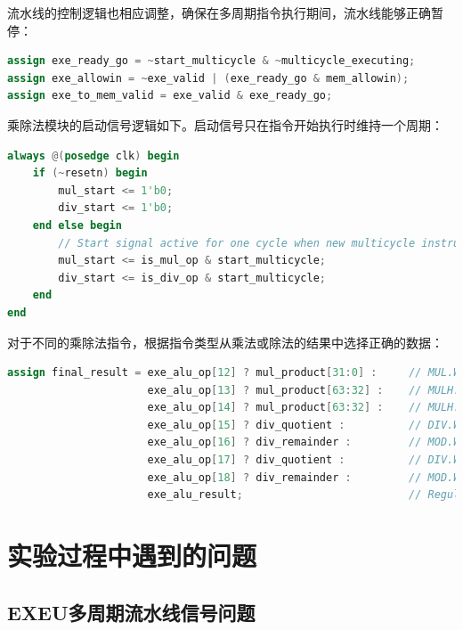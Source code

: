 \documentclass[11pt]{article}
\begin{document}
流水线的控制逻辑也相应调整，确保在多周期指令执行期间，流水线能够正确暂停：

\begin{lstlisting}[language=verilog]
assign exe_ready_go = ~start_multicycle & ~multicycle_executing;
assign exe_allowin = ~exe_valid | (exe_ready_go & mem_allowin);
assign exe_to_mem_valid = exe_valid & exe_ready_go;
\end{lstlisting}

乘除法模块的启动信号逻辑如下。启动信号只在指令开始执行时维持一个周期：

\begin{lstlisting}[language=verilog]
always @(posedge clk) begin
    if (~resetn) begin
        mul_start <= 1'b0;
        div_start <= 1'b0;
    end else begin
        // Start signal active for one cycle when new multicycle instruction arrives
        mul_start <= is_mul_op & start_multicycle;
        div_start <= is_div_op & start_multicycle;
    end
end
\end{lstlisting}

对于不同的乘除法指令，根据指令类型从乘法或除法的结果中选择正确的数据：

\begin{lstlisting}[language=verilog]
assign final_result = exe_alu_op[12] ? mul_product[31:0] :     // MUL.W: low 32 bits
                      exe_alu_op[13] ? mul_product[63:32] :    // MULH.W: high 32 bits (signed)
                      exe_alu_op[14] ? mul_product[63:32] :    // MULH.WU: high 32 bits (unsigned)
                      exe_alu_op[15] ? div_quotient :          // DIV.W: quotient (signed)
                      exe_alu_op[16] ? div_remainder :         // MOD.W: remainder (signed)
                      exe_alu_op[17] ? div_quotient :          // DIV.WU: quotient (unsigned)
                      exe_alu_op[18] ? div_remainder :         // MOD.WU: remainder (unsigned)
                      exe_alu_result;                          // Regular ALU result
\end{lstlisting}

\section{实验过程中遇到的问题}

\subsection{EXEU多周期流水线信号问题}
\end{document}
